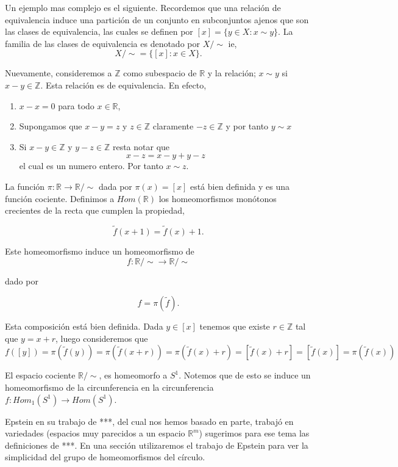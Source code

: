 Un ejemplo mas complejo es el siguiente. Recordemos que una relación de equivalencia induce una partición de un conjunto en subconjuntos ajenos que son las clases de equivalencia, las cuales se definen por $[x]=\{y \in X : x \sim y\}$. La familia de las clases de equivalencia es denotado por $X/ \sim$ ie, $$X/ \sim=\{[x]: x \in X\}.$$  

\begin{ej}\label{ej:Cir_un_coc}
Nuevamente, consideremos a $\mathbb{Z}$ como subespacio de $\mathbb{R}$ y la relación; $x \sim y$ si $x-y \in \mathbb{Z}$. Esta relación es de equivalencia. En efecto, 

	\begin{enumerate}
	\item $x-x=0 $ para todo $x \in \mathbb{R}$,
	\item Supongamos que $x-y=z$ y $z \in \mathbb{Z}$ claramente $-z \in \mathbb{Z}$ y por tanto $y \sim x$
	\item Si $x-y \in \mathbb{Z}$ y $y-z \in \mathbb{Z}$ resta notar que $$x-z=x-y+y-z$$
el cual es un numero entero. Por tanto $x \sim z$.  
	\end{enumerate}

La función  $\pi: \mathbb{R} \to \mathbb{R}/ \sim$ dada por
$\pi (x)=[x]$ está bien definida y es una función cociente. Definimos a $Hom(\mathbb{R})$ los homeomorfismos monótonos crecientes de la recta que cumplen la propiedad, 

$$\tilde{f}(x+1)= \tilde{f}(x)+1.$$

Este homeomorfismo induce un homeomorfismo de 
$$f:\mathbb{R}/ \sim \to  \mathbb{R}/ \sim$$

dado por 
 
$$f=\pi(\tilde{f}).$$

 Esta composición está bien definida. Dada $y \in [x]$ tenemos que existe $r \in \mathbb{Z}$ tal que $y=x+r$, luego consideremos que 
 $$f([y])=\pi(\tilde{f}(y))=\pi(\tilde{f}(x+r))=\pi(\tilde{f}(x)+r)=[\tilde{f}(x)+r]=[\tilde{f}(x)]=\pi(\tilde{f}(x))$$


El espacio cociente $\mathbb{R}/ \sim$, es  homeomorfo a $S^1$. Notemos que de esto se induce un homeomorfismo de la circunferencia en la circunferencia $f:Hom_1(S^1) \to Hom(S^1)$.
\end{ej}


Epstein en su trabajo de ***, del cual nos hemos basado en parte, trabajó en variedades (espacios muy parecidos a un espacio $\mathbb{R}^m$) sugerimos para ese tema las definiciones de ***. En una sección utilizaremos el trabajo de Epstein para ver la simplicidad del grupo de homeomorfismos del círculo.


